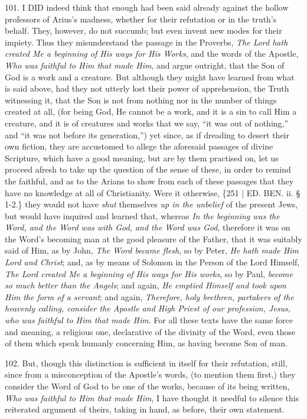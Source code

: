 101. I DID
indeed think that enough had been said already against the hollow
professors of Arius's madness, whether for their refutation or in the
truth's behalf. They, however, do not succumb; but even invent new
modes for their impiety. Thus they misunderstand the passage in the
Proverbs, \emph{The Lord hath created Me a beginning of His ways for His
Works}, and the words of the Apostle, \emph{Who was faithful to Him
that made Him}, and argue outright, that the Son of God is a work
and a creature. But although they might have learned from what is said
above, had they not utterly lost their power of apprehension, the
Truth witnessing it, that the Son is not from nothing nor in the
number of things created at all, (for being God, He cannot be a work,
and it is a sin to call Him a creature, and it is of creatures and
works that we say, ``it was out of nothing,'' and ``it was not before its
generation,'') yet since, as if dreading to desert their own fiction,
they are accustomed to allege the aforesaid passages of divine
Scripture, which have a good meaning, but are by them practised on,
let us proceed afresh to take up the question of the sense of these,
in order to remind the faithful, and as to the Arians to show from
each of these passages that they have no knowledge at all of
Christianity. Were it otherwise, \{251 | ED. BEN. ii. § 1-2.\}
they would not have \emph{shut} themselves \emph{up in the unbelief}
of the present Jews, but would have inquired and learned that, whereas
\emph{In the beginning was the Word, and the Word was with God, and the
Word was God}, therefore it was on the Word's becoming man at the
good pleasure of the Father, that it was suitably said of Him, as by
John, \emph{The Word became flesh}, so by Peter, \emph{He hath made Him
Lord and Christ}; and, as by means of Solomon in the Person of the
Lord Himself, \emph{The Lord created Me a beginning of His ways for His
works}, so by Paul, \emph{become so much better than the Angels};
and again, \emph{He emptied Himself and took upon Him the form of a
servant}; and again, \emph{Therefore, holy brethren, partakers of the
heavenly calling, consider the Apostle and High Priest of our
profession, Jesus, who was faithful to Him that made Him}. For all
these texts have the same force and meaning, a religious one,
declarative of the divinity of the Word, even those of them which
speak humanly concerning Him, as having become Son of man.

102. But, though this
distinction is sufficient in itself for their refutation, still, since
from a misconception of the Apostle's words, (to mention them first,)
they consider the Word of God to be one of the works, because of its
being written, \emph{Who was faithful to Him that made Him}, I have
thought it needful to silence this reiterated argument of theirs,
taking in hand, as before, their own statement.

